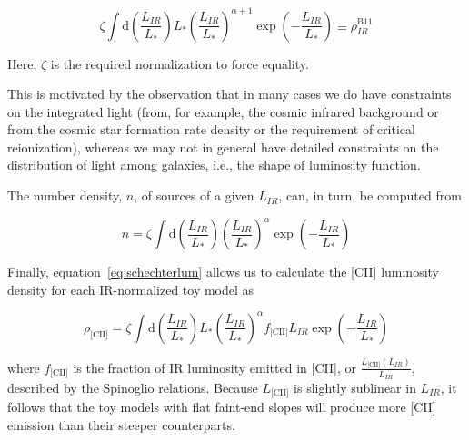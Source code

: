 \documentclass[12pt,preprint]{emulateapj}
\begin{document}
\begin{equation}
\zeta \int \textrm{d}\left(\frac{L_{IR}}{L_*}\right) L_* \left(\frac{L_{IR}}{L_*}\right)^{\alpha+1} \exp\left(-\frac{L_{IR}}{L_*}\right) \equiv \rho_{IR}^{\textrm{B11}}
\label{eq:schechterlum}
\end{equation}

Here, $\zeta$ is the required normalization to force equality. 

This is motivated by the observation that in many cases we do have constraints on the integrated light (from, for example, the cosmic infrared background or from the cosmic star formation rate density or the requirement of critical reionization), whereas we may not in general have detailed constraints on the distribution of light among galaxies, i.e., the shape of luminosity function.
 
The number density, $n$, of sources of a given $L_{IR}$, can, in turn, be computed from 

\begin{equation}
n = \zeta \int \textrm{d}\left(\frac{L_{IR}}{L_*}\right) \left(\frac{L_{IR}}{L_*}\right)^{\alpha}\exp\left(-\frac{L_{IR}}{L_*}\right)
\end{equation}

Finally, equation~\ref{eq:schechterlum} allows us to calculate the [CII] luminosity density for each IR-normalized toy model as

\begin{equation}
\rho_{\textrm{[CII]}} = \zeta \int \textrm{d}\left(\frac{L_{IR}}{L_*}\right) L_* \left(\frac{L_{IR}}{L_*}\right)^{\alpha} f_{\textrm{[CII]}}L_{IR} \exp\left(-\frac{L_{IR}}{L_*}\right) 
\end{equation}

where $f_{\textrm{[CII]}}$ is the fraction of IR luminosity emitted in [CII], or $\frac{L_{\textrm{[CII]}}(L_{IR})}{L_{IR}}$, described by the Spinoglio relations. Because $L_{\textrm{[CII]}}$ is slightly sublinear in $L_{IR}$, it follows that the toy models with flat faint-end slopes will produce more [CII] emission than their steeper counterparts. 


\end{document}
